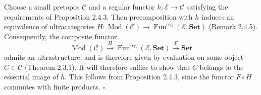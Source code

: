 \documentclass[11pt]{article}
\newcommand{\E}{\mathcal{E}}          %
\newcommand{\C}{\mathcal{C}}          %
\newcommand{\Fun}{\operatorname{Fun}}
\newcommand{\Funreg}{\Fun^{\mathrm{reg}}}
\newcommand{\Mod}{\operatorname{Mod}}
\newcommand{\Set}{\mathbf{Set}}
\begin{document}
Choose a small pretopos $\C$ and a regular functor $h : \E \to \C$ satisfying the requirements of Proposition 2.4.3. Then precomposition with $h$ induces an equivalence of ultracategories $H : \Mod(\C) \to \Funreg(\E,\Set)$ (Remark 2.4.5). Consequently, the composite functor
\[
\Mod(\C) \xrightarrow{\ H\ } \Funreg(\E,\Set) \xrightarrow{\ F\ } \Set
\]
admits an ultrastructure, and is therefore given by evaluation on some object $C \in \C$ (Theorem 2.3.1). It will therefore suffice to show that $C$ belongs to the essential image of $h$. This follows from Proposition 2.4.3, since the functor $F \circ H$ commutes with finite products. \hfill$\square$


\end{document}
